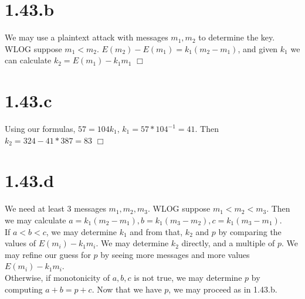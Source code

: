\documentclass{article}
\begin{document}
\section*{1.43.b}
We may use a plaintext attack with messages $m_1,m_2$ to determine the key. WLOG suppose $m_1 < m_2$. $E(m_2) - E(m_1) = k_1(m_2-m_1)$, and given $k_1$ we can calculate $k_2 = E(m_1) - k_1m_1$ $\Box$
\section*{1.43.c}
Using our formulas, $57 = 104k_1$, $k_1 = 57*104^{-1} = 41$. Then $k_2 = 324 - 41*387 = 83$ $\Box$
\section*{1.43.d}
We need at least 3 messages $m_1,m_2,m_3$. WLOG suppose $m_1<m_2<m_3$. Then we may calculate $a = k_1(m_2-m_1), b = k_1(m_3-m_2), c = k_1(m_3-m_1)$.\\
If $a < b < c$, we may determine $k_1$ and from that, $k_2$ and $p$ by comparing the values of $E(m_i) - k_1m_i$. We may determine $k_2$ directly, and a multiple of $p$. We may refine our guess for $p$ by seeing more messages and more values $E(m_i) - k_1m_i$.\\
Otherwise, if monotonicity of $a,b,c$ is not true, we may determine $p$ by computing $a + b = p + c$. Now that we have $p$, we may proceed as in 1.43.b.
\end{document}
